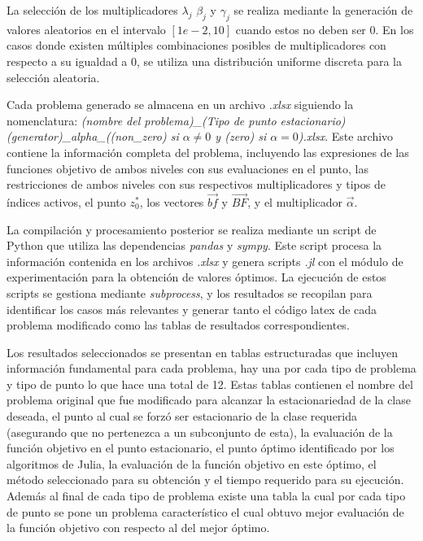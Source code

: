     La selección de los multiplicadores $\lambda_j$ $\beta_j$ y $\gamma_j$ se realiza mediante la generación de valores aleatorios en el intervalo $[1e-2, 10]$ cuando estos no deben ser $0$. En los casos donde existen múltiples combinaciones posibles de multiplicadores con respecto a su igualdad a $0$, se utiliza una distribución uniforme discreta para la selección aleatoria.
    
    Cada problema generado se almacena en un archivo \textit{.xlsx} siguiendo la nomenclatura: \textit{(nombre del problema)\_(Tipo de punto estacionario)(generator)\_alpha\_((non\_zero) si $\alpha \neq 0$ y (zero) si $\alpha = 0$).xlsx}. Este archivo contiene la información completa del problema, incluyendo las expresiones de las funciones objetivo de ambos niveles con sus evaluaciones en el punto, las restricciones de ambos niveles con sus respectivos multiplicadores y tipos de índices activos, el punto $z^*_0$, los vectores $\vec{bf}$ y $\vec{BF}$, y el multiplicador $\vec{\alpha}$.
    
    La compilación y procesamiento posterior se realiza mediante un script de Python que utiliza las dependencias \textit{pandas} y \textit{sympy}. Este script procesa la información contenida en los archivos \textit{.xlsx} y genera scripts \textit{.jl} con el módulo de experimentación para la obtención de valores óptimos. La ejecución de estos scripts se gestiona mediante \textit{subprocess}, y los resultados se recopilan para identificar los casos más relevantes y generar tanto el código latex de cada problema modificado como las tablas de resultados correspondientes.
    
    
    Los resultados seleccionados se presentan en tablas estructuradas que incluyen información fundamental para cada problema, hay una por cada tipo de problema y tipo de punto lo que hace una total de 12. Estas tablas contienen el nombre del problema original que fue modificado para alcanzar la estacionariedad de la clase deseada, el punto al cual se forzó ser estacionario de la clase requerida (asegurando que no pertenezca a un subconjunto de esta), la evaluación de la función objetivo en el punto estacionario, el punto óptimo identificado por los algoritmos de Julia, la evaluación de la función objetivo en este óptimo, el método seleccionado para su obtención y el tiempo requerido para su ejecución. Además al final de cada tipo de problema existe una tabla la cual por cada tipo de punto se pone un problema característico el cual obtuvo mejor evaluación de la función objetivo con respecto al del mejor óptimo.



